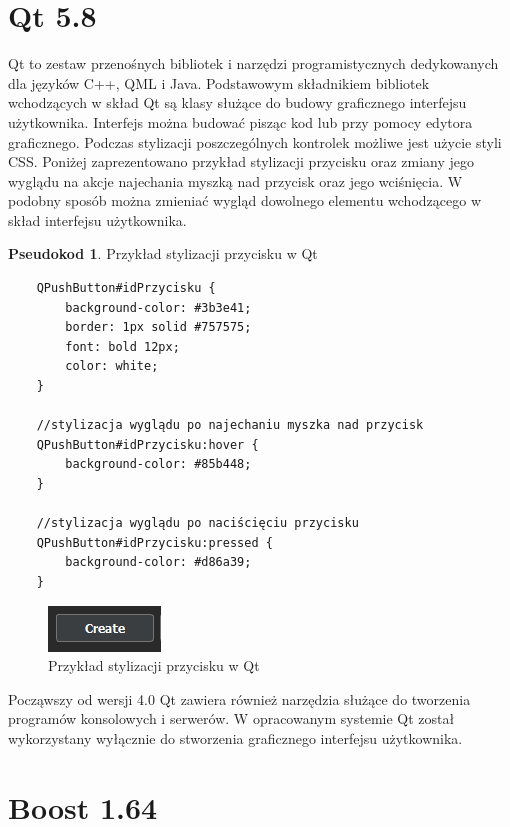 \documentclass[a4paper,11pt,twoside]{report}
\theoremstyle{definition}
\newtheorem{pseudokod}{Pseudokod}[subsection]
\begin{document}
\section{Qt 5.8}

Qt to zestaw przenośnych bibliotek i narzędzi programistycznych dedykowanych dla języków C++, QML i Java. Podstawowym składnikiem bibliotek wchodzących w skład Qt są klasy służące do budowy graficznego interfejsu użytkownika. Interfejs można budować pisząc kod lub przy pomocy edytora graficznego. Podczas stylizacji poszczególnych kontrolek możliwe jest użycie styli CSS. Poniżej zaprezentowano przykład stylizacji przycisku oraz zmiany jego wyglądu na akcje najechania myszką nad przycisk oraz jego wciśnięcia. W podobny sposób można zmieniać wygląd dowolnego elementu wchodzącego w skład interfejsu użytkownika.

\begin{pseudokod}
Przykład stylizacji przycisku w Qt
\begin{verbatim}
    QPushButton#idPrzycisku {
        background-color: #3b3e41;
        border: 1px solid #757575;
        font: bold 12px;
        color: white;
    }
    
    //stylizacja wyglądu po najechaniu myszka nad przycisk
    QPushButton#idPrzycisku:hover {
        background-color: #85b448;
    }
    
    //stylizacja wyglądu po naciścięciu przycisku
    QPushButton#idPrzycisku:pressed {
        background-color: #d86a39;
    }
\end{verbatim}
\end{pseudokod}

\begin{figure}[h!]
\centering
\includegraphics[scale=1.0]{QPushButton}
\caption[Przykład stylizacji przycisku w Qt]{Przykład stylizacji przycisku w Qt}
\end{figure}

Począwszy od wersji 4.0 Qt zawiera również narzędzia służące do tworzenia programów konsolowych i serwerów. W opracowanym systemie Qt został wykorzystany wyłącznie do stworzenia graficznego interfejsu użytkownika.

\section{Boost 1.64}
\end{document}
